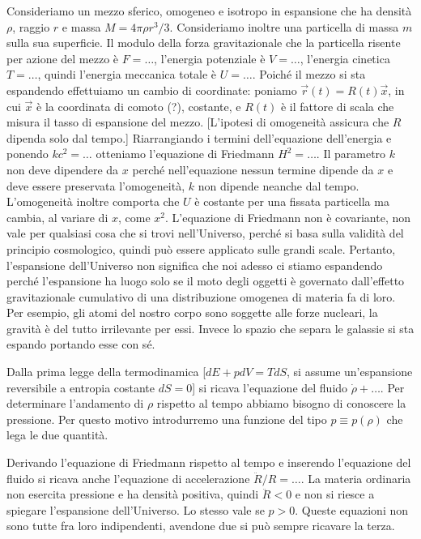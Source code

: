 \documentclass[12pt,a4paper,fleqn,draft]{article}
\begin{document}
Consideriamo un mezzo sferico, omogeneo e isotropo in espansione che ha densità
$\rho$, raggio $r$ e massa $M = 4\pi\rho r^3/3$. Consideriamo inoltre una
particella di massa $m$ sulla sua superficie. Il modulo della forza
gravitazionale che la particella risente per azione del mezzo è $F = \dots$,
l'energia potenziale è $V = \dots$, l'energia cinetica $T = \dots$, quindi
l'energia meccanica totale è $U = \dots$.  Poiché il mezzo si sta espandendo
effettuiamo un cambio di coordinate: poniamo $\vec{r}(t) = R(t) \vec{x}$, in cui
$\vec{x}$ è la coordinata di comoto (?), costante, e $R(t)$ è il fattore di
scala che misura il tasso di espansione del mezzo. [L'ipotesi di omogeneità
assicura che $R$ dipenda solo dal tempo.]  Riarrangiando i termini
dell'equazione dell'energia e ponendo $kc^2 = \dots$ otteniamo l'equazione di
Friedmann $H^2 = \dots$. Il parametro $k$ non deve dipendere da $x$ perché
nell'equazione nessun termine dipende da $x$ e deve essere preservata
l'omogeneità, $k$ non dipende neanche dal tempo. L'omogeneità inoltre comporta
che $U$ è costante per una fissata particella ma cambia, al variare di $x$, come
$x^2$. L'equazione di Friedmann non è covariante, non vale per qualsiasi cosa
che si trovi nell'Universo, perché si basa sulla validità del principio
cosmologico, quindi può essere applicato sulle grandi scale. Pertanto,
l'espansione dell'Universo non significa che noi adesso ci stiamo espandendo
perché l'espansione ha luogo solo se il moto degli oggetti è governato
dall'effetto gravitazionale cumulativo di una distribuzione omogenea di materia
fa di loro. Per esempio, gli atomi del nostro corpo sono soggette alle forze
nucleari, la gravità è del tutto irrilevante per essi. Invece lo spazio che
separa le galassie si sta espando portando esse con sé.

Dalla prima legge della termodinamica [$dE + pdV = TdS$, si assume un'espansione
reversibile a entropia costante $dS = 0$] si ricava l'equazione del fluido
$\dot{\rho} + \dots$. Per determinare l'andamento di $\rho$ rispetto al tempo
abbiamo bisogno di conoscere la pressione. Per questo motivo introdurremo una
funzione del tipo $p \equiv p(\rho)$ che lega le due quantità.

Derivando l'equazione di Friedmann rispetto al tempo e inserendo l'equazione del
fluido si ricava anche l'equazione di accelerazione $\ddot{R}/R = \dots$. La
materia ordinaria non esercita pressione e ha densità positiva, quindi
$\ddot{R}<0$ e non si riesce a spiegare l'espansione dell'Universo. Lo stesso
vale se $p>0$. Queste equazioni non sono tutte fra loro indipendenti, avendone
due si può sempre ricavare la terza.
\end{document}
